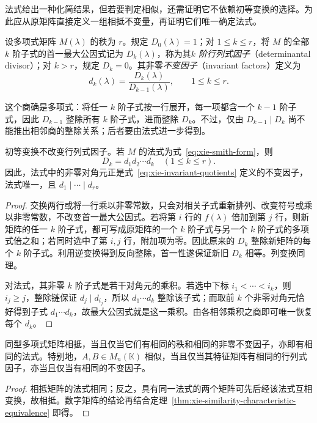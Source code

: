 法式给出一种化简结果，但若要判定相似，还需证明它不依赖初等变换的选择。为此应从原矩阵直接定义一组相抵不变量，再证明它们唯一确定法式。

\begin{definition}
\label{def:xie-determinantal-divisors}
设多项式矩阵 $M(\lambda)$ 的秩为 $r$。规定 $D_0(\lambda)=1$；对 $1\le k\le r$，将 $M$ 的全部 $k$ 阶子式的首一最大公因式记为 $D_k(\lambda)$，称为其\emph{$k$ 阶行列式因子}（determinantal divisor）；对 $k>r$，规定 $D_k=0$。其非零\emph{不变因子}（invariant factors）定义为
\begin{equation}
\label{eq:xie-invariant-quotients}
    d_k(\lambda)=\frac{D_k(\lambda)}{D_{k-1}(\lambda)},
    \qquad 1\le k\le r.
\end{equation}
\end{definition}

这个商确是多项式：将任一 $k$ 阶子式按一行展开，每一项都含一个 $k-1$ 阶子式，因此 $D_{k-1}$ 整除所有 $k$ 阶子式，进而整除 $D_k$。不过，仅由 $D_{k-1}\mid D_k$ 尚不能推出相邻商的整除关系；后者要由法式进一步得到。

\begin{theorem}
\label{thm:xie-smith-uniqueness}
初等变换不改变行列式因子。若 $M$ 的法式为式~\eqref{eq:xie-smith-form}，则
\begin{equation}
\label{eq:xie-smith-divisors}
    D_k=d_1d_2\cdots d_k\quad(1\le k\le r).
\end{equation}
因此，法式中的非零对角元正是式~\eqref{eq:xie-invariant-quotients} 定义的不变因子，法式唯一，且 $d_1\mid\cdots\mid d_r$。
\end{theorem}
\begin{proof}
交换两行或将一行乘以非零常数，只会对相关子式重新排列、改变符号或乘以非零常数，不改变首一最大公因式。若将第 $i$ 行的 $f(\lambda)$ 倍加到第 $j$ 行，则新矩阵的任一 $k$ 阶子式，都可写成原矩阵的一个 $k$ 阶子式与另一个 $k$ 阶子式的多项式倍之和；若同时选中了第 $i,j$ 行，附加项为零。因此原来的 $D_k$ 整除新矩阵的每个 $k$ 阶子式。利用逆变换得到反向整除，首一性遂保证新旧 $D_k$ 相等。列变换同理。

对法式，其非零 $k$ 阶子式是若干对角元的乘积。若选中下标 $i_1<\cdots<i_k$，则 $i_j\ge j$，整除链保证 $d_j\mid d_{i_j}$，所以 $d_1\cdots d_k$ 整除该子式；而取前 $k$ 个非零对角元恰好得到子式 $d_1\cdots d_k$，故最大公因式就是这一乘积。由各相邻乘积之商即可唯一恢复每个 $d_k$。
\end{proof}

\begin{theorem}
\label{thm:xie-complete-similarity-invariants}
同型多项式矩阵相抵，当且仅当它们有相同的秩和相同的非零不变因子，亦即有相同的法式。特别地，$A,B\in M_n(\mathbb K)$ 相似，当且仅当其特征矩阵有相同的行列式因子，亦当且仅当有相同的不变因子。
\end{theorem}
\begin{proof}
相抵矩阵的法式相同；反之，具有同一法式的两个矩阵可先后经该法式互相变换，故相抵。数字矩阵的结论再结合定理~\ref{thm:xie-similarity-characteristic-equivalence} 即得。
\end{proof}

